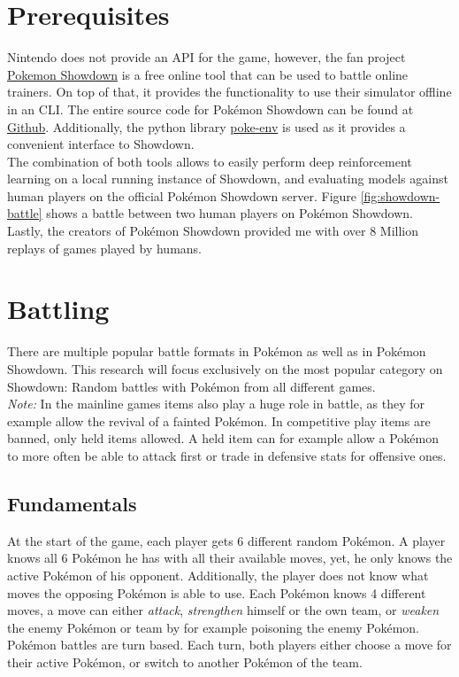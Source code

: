 \documentclass{article}
\begin{document}
\section{Prerequisites}
Nintendo does not provide an API for the game, however, the fan project
\href{https://play.pokemonshowdown.com/}{Pokemon Showdown} is a
free online tool that can be used to battle online trainers. On top of that,
it provides the functionality to use their simulator offline in an CLI. The
entire source code for Pokémon Showdown can be found at 
\href{https://github.com/smogon/pokemon-showdown}{Github}.
Additionally, the python library \href{https://poke-env.readthedocs.io/en/latest/}{poke-env}
is used as it provides a convenient interface to Showdown. \\
The combination of both tools allows to easily perform deep reinforcement learning
on a local running instance of Showdown, and evaluating models against 
human players on the official Pokémon Showdown server. Figure \ref{fig:showdown-battle}
shows a battle between two human players on Pokémon Showdown. Lastly, the creators
of Pokémon Showdown provided me with over 8 Million replays of games played
by humans.

\section{Battling}
There are multiple popular battle formats in Pokémon as well as in Pokémon
Showdown. This research will focus exclusively on the most popular category
on Showdown: Random battles with Pokémon from all different games. \\
\textit{Note:} In the mainline games items also play a huge role in battle,
as they for example allow the revival of a fainted Pokémon. In competitive
play items are banned, only held items allowed. A held item can for example
allow a Pokémon to more often be able to attack first or trade in defensive
stats for offensive ones.

\subsection{Fundamentals}
At the start of the game, each player gets 6 different random Pokémon. A player
knows all 6 Pokémon he has with all their available moves, yet, he only knows
the active Pokémon of his opponent. Additionally, the player does not know what
moves the opposing Pokémon is able to use. Each Pokémon knows 4 different moves,
a move can either \textit{attack}, \textit{strengthen} himself or the own team,
or \textit{weaken} the enemy Pokémon or team by for example poisoning the enemy
Pokémon. \\ 
Pokémon battles are turn based. Each turn, both players either choose a move
for their active Pokémon, or switch to another Pokémon of the team. 
\end{document}
